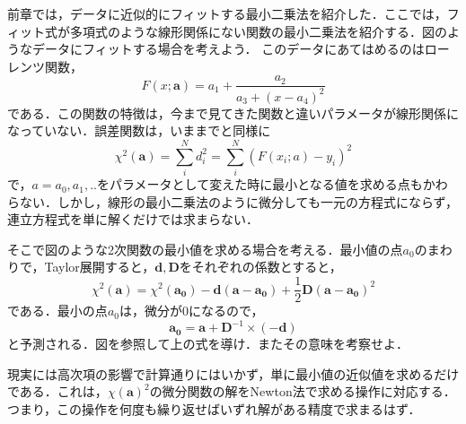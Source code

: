 前章では，データに近似的にフィットする最小二乗法を紹介した．ここでは，フィット式が多項式のような線形関係にない関数の最小二乗法を紹介する．図のようなデータにフィットする場合を考えよう．
このデータにあてはめるのはローレンツ関数，
\begin{equation*}
F \left(x;\mathbf{a} \right)=a _{1}+\displaystyle \frac{a _{2}}{a _{3}+\left(x -a _{4}\right)^{2}}
\end{equation*}
である．この関数の特徴は，今まで見てきた関数と違いパラメータが線形関係になっていない．誤差関数は，いままでと同様に
\begin{equation*}
\chi ^{2}\left(\mathbf{a} \right)={\sum_i^N }d _{i }^{2}=\sum_i^N \left(F \left(x _{i };a \right)-y _{i }\right)^{2}
\end{equation*}
で，$a={a_0, a_1,..}$をパラメータとして変えた時に最小となる値を求める点もかわらない．しかし，線形の最小二乗法のように微分しても一元の方程式にならず，連立方程式を単に解くだけでは求まらない．

そこで図のような2次関数の最小値を求める場合を考える．最小値の点$a_0$のまわりで，Taylor展開すると，$\mathbf{d,D}$をそれぞれの係数とすると，
\begin{equation*}
\chi^2 \left( \mathbf{a} \right)= \chi^2 \left( \mathbf{a_0}  \right) - \mathbf{d} \left(\mathbf{a}-\mathbf{a_0} \right) +\frac{1}{2} \mathbf{D} \left(\mathbf{a}-\mathbf{a_0} \right)^{2}
\end{equation*}
である．最小の点$a_0$は，微分が$0$になるので，
\begin{equation*}
\mathbf{a _{0}}=\mathbf{a} + \mathbf{D} ^{-1} \times (-\mathbf{d})
\end{equation*}
と予測される．図を参照して上の式を導け．またその意味を考察せよ．
\pagebreak
{}

現実には高次項の影響で計算通りにはいかず，単に最小値の近似値を求めるだけである．これは，$ \chi \left(\mathbf{a} \right)  ^{2}$の微分関数の解をNewton法で求める操作に対応する．つまり，この操作を何度も繰り返せばいずれ解がある精度で求まるはず．

